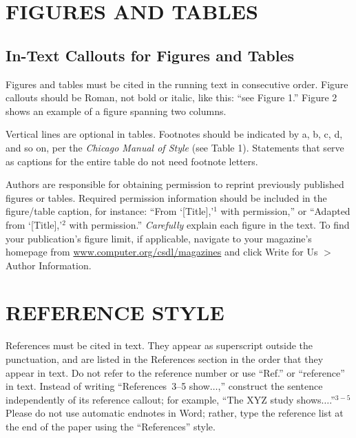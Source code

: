\documentclass{IEEEcsmag}
\begin{document}
\section{FIGURES AND TABLES}

\subsection{In-Text Callouts for Figures and Tables}

Figures and tables must be cited in the running text in consecutive order. Figure callouts should be Roman, not bold or italic, like this: ``see Figure 1.'' Figure 2 shows an example of a figure spanning two columns.

Vertical lines are optional in tables. Footnotes should be indicated by a, b, c, d, and so on, per the \emph{Chicago Manual of Style} (see Table 1). Statements that serve as captions for the entire table do not need footnote letters. 

Authors are responsible for obtaining permission to reprint previously published figures or tables. Required permission information should be included in the figure/table caption, for instance: ``From `[Title],'$^1$ with permission,'' or ``Adapted from `[Title],'$^2$ with permission.'' \emph{Carefully} explain each figure in the text. To find your publication's figure limit, if applicable, navigate to your magazine's homepage from \href{https://www.computer.org/csdl/magazines}{www.computer.org/csdl/magazines} and click Write for Us $>$ Author Information.




\section{REFERENCE STYLE}
References must be cited in text. They appear as superscript outside the punctuation, and are listed in the References section in the order that they appear in text. Do not refer to the reference number or use ``Ref.'' or ``reference'' in text. Instead of writing ``References~3--5 show$\ldots$,'' construct the sentence independently of its reference callout; for example, ``The XYZ study shows$\ldots$.''$^{3-5}$ Please do not use automatic endnotes in Word; rather, type the reference list at the end of the paper using the ``References'' style.
\end{document}

